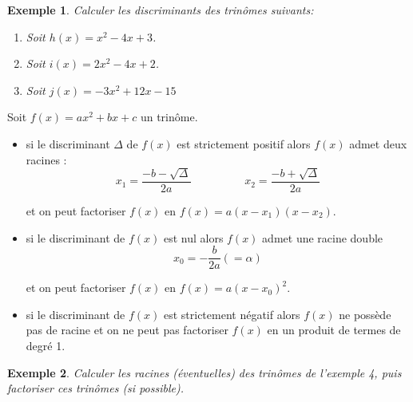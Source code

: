\documentclass[a4paper,11pt]{article}
\theoremstyle{break}
\newtheorem{exemple}{Exemple}
\begin{document}
  \begin{exemple}
    
    Calculer les discriminants des trinômes suivants:
    \begin{enumerate}
     \item Soit $h(x)=x^2-4x+3$.
     \item Soit $i(x)=2x^2-4x+2$.
     \item Soit $j(x)=-3x^2+12x-15$
    \end{enumerate}
   \end{exemple}
  
  \begin{theorem}[Central]
    Soit $f(x)=ax^2+bx+c$ un trinôme.
    \begin{itemize}
     \item  si le discriminant $\Delta$ de $f(x)$ est strictement positif alors
     $f(x)$ admet deux racines :
     $$x_1=\frac{-b-\sqrt{\Delta}}{2a} \hspace{2cm} x_2=\frac{-b+\sqrt{\Delta}}{2a}$$
     
     et on peut factoriser $f(x)$ en $f(x)=a(x-x_1)(x-x_2)$.
     
     \item si le discriminant de $f(x)$ est nul alors $f(x)$ admet une racine double
     $$x_0=-\frac{b}{2a}(=\alpha)$$
     
     et on peut factoriser $f(x)$ en $f(x)=a(x-x_0)^2$.
     
     \item si le discriminant de $f(x)$ est strictement négatif alors
     $f(x)$ ne possède pas de racine et on ne peut pas factoriser $f(x)$ en un produit de termes de degré 1.
    \end{itemize}    
  \end{theorem}
  
  \begin{exemple}
    Calculer les racines (éventuelles) des trinômes de l'exemple 4, puis factoriser
    ces trinômes (si possible).
   \end{exemple}
   
\end{document}
